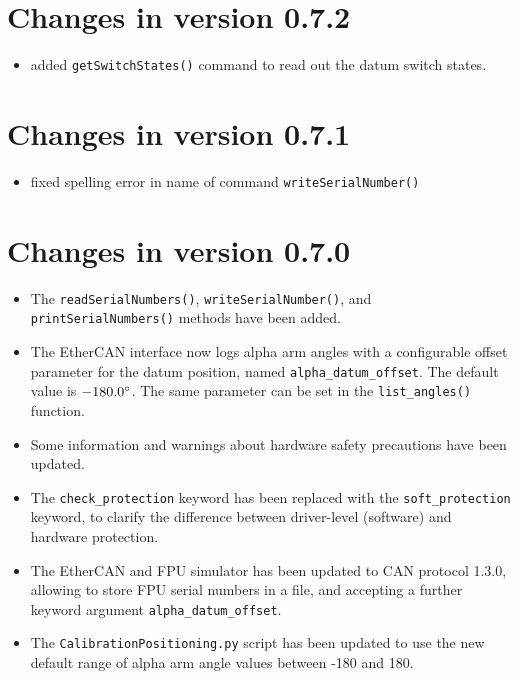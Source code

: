 \documentclass[fontsize=12,a4paper]{scrreprt}
\begin{document}
\section*{Changes in version 0.7.2}
\begin{itemize}
\item added \texttt{getSwitchStates()} command to read out
  the datum switch states.
\end{itemize}


\section*{Changes in version 0.7.1}
\begin{itemize}
\item fixed spelling error in name of command \texttt{writeSerialNumber()}

\end{itemize}
\section*{Changes in version 0.7.0}
\begin{itemize}
\item The \texttt{readSerialNumbers()}, \texttt{writeSerialNumber()},
  and \texttt{printSerialNumbers()} methods have been added.

\item The EtherCAN interface now logs alpha arm angles with a configurable offset
  parameter for the datum position, named
  \texttt{alpha\_datum\_offset}. The default value is
  $-180.0\degree$.  The same parameter can be set in the
  \texttt{list\_angles()} function.

\item Some information and warnings about hardware safety precautions
  have been updated.

\item The \texttt{check\_protection} keyword has been replaced
  with the \texttt{soft\_protection} keyword, to clarify
  the difference between driver-level (software) and
  hardware protection.

\item The EtherCAN and FPU simulator has been updated to CAN protocol
  1.3.0, allowing to store FPU serial numbers in a file, and accepting
  a further keyword argument \texttt{alpha\_datum\_offset}.

\item The \texttt{CalibrationPositioning.py} script has been updated
  to use the new default range of alpha arm angle values between -180 and 180.
\end{itemize}
\end{document}
